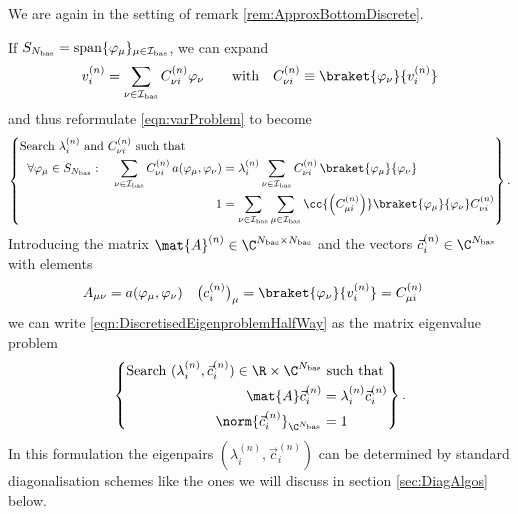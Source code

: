 \begin{rem}
	\label{rem:DiscreteFormulation}
	We are again in the setting of remark \ref{rem:ApproxBottomDiscrete}.

	\noindent
	If $S_{N_\text{bas}} = \operatorname{span} \{\varphi_\mu\}_{\mu \in \mathcal{I}_\text{bas}}$, we can expand
	\[ v^{(n)}_i = \sum_{\nu\in\Ibas} C^{(n)}_{\nu i} \varphi_\nu \qquad \text{with} \quad C^{(n)}_{\nu i} \equiv \braket{\varphi_\nu}{v^{(n)}_i} \]
	and thus reformulate \eqref{eqn:varProblem} to become
	\begin{equation}
		\label{eqn:DiscretisedEigenproblemHalfWay}
		\left\{
		\begin{aligned}
			\text{Search $\lambda_i^{(n)}$ and $C^{(n)}_{\nu i}$ such that} \hspace{30pt} & \\
			\forall \varphi_\mu \in S_{\Nbas}:
			\quad \sum_{\nu\in\Ibas} C^{(n)}_{\nu i} \, a(\varphi_\mu, \varphi_\nu)
			&= \lambda_i^{(n)} \sum_{\nu\in\Ibas} C^{(n)}_{\nu i} \, \braket{\varphi_\mu}{\varphi_\nu}\\
			1 &= 
			\sum_{\nu\in\Ibas} \sum_{\mu\in\Ibas} \cc{\left(C^{(n)}_{\mu i}\right)} \braket{\varphi_\mu}{\varphi_\nu} C^{(n)}_{\nu i}
		\end{aligned}
		\right\}.
	\end{equation}
	Introducing the matrix $\mat{A}^{(n)} \in \C^{\Nbas \times \Nbas}$
	and the vectors $\vec{c}^{(n)}_i \in \C^{\Nbas}$
	with elements
	\begin{align}
		\label{eqn:DiscretisationExpression}
		A_{\mu\nu} &= a(\varphi_\mu, \varphi_\nu) & \big(c^{(n)}_i\big)_\mu &= \braket{\varphi_\nu}{v^{(n)}_i} = C^{(n)}_{\mu i}
	\end{align}
	we can write \eqref{eqn:DiscretisedEigenproblemHalfWay}
	as the matrix eigenvalue problem
	\begin{equation}
		\left\{
			\begin{aligned}
				\text{Search $(\lambda_i^{(n)}, \vec{c}^{(n)}_i) \in \R \times \C^{\Nbas}$}& \text{ such that}\\
				\mat{A} \vec{c}^{(n)}_i &= \lambda_i^{(n)} \vec{c}^{(n)}_i \\
				\norm{\vec{c}^{(n)}_i}_{\C^{\Nbas}} &= 1
		\label{eqn:DiscretisedEigenproblem}
		\end{aligned}
		\right\}.
	\end{equation}
	In this formulation the eigenpairs $(\lambda_i^{(n)}, \vec{c}^{(n)}_i)$
	can be determined by standard diagonalisation schemes
	like the ones we will discuss in section \vref{sec:DiagAlgos} below.
\end{rem}

